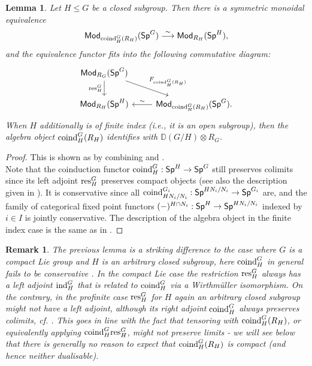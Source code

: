 \documentclass[reqno]{amsart}
\numberwithin{equation}{section}\theoremstyle{thms}
\newtheorem{lem}[equation]{Lemma}
\theoremstyle{defn}
\newtheorem{rem}[equation]{Remark}
\newcommand{\bD}{\mathbb{D}}
\newcommand{\tn}[1]{\textnormal{#1}}
\newcommand{\tsf}[1]{\textsf{\textup{#1}}}
\newcommand{\Mod}{\tsf{Mod}}
\newcommand{\spec}{\tsf{Sp}}
\newcommand{\specg}{\tsf{Sp}^G}
\begin{document}
\begin{lem}\label{lem:resasbasechangeprofinite}
Let $H \leq G$ be a closed subgroup. Then there is a symmetric monoidal equivalence 
$$\Mod_{\tn{coind}^{G}_H(R_{H})}(\specg) \stackrel{\sim}{\longrightarrow} \Mod_{R_{H}}(\spec^{H}),$$
and the equivalence functor fits into the following commutative diagram:
\[\begin{tikzcd}
	{\Mod_{R_G}(\specg)} & \\
	{\Mod_{R_{H}}(\spec^{H})} & {\Mod_{\tn{coind}^{G}_H(R_{H})}(\specg).}
	\arrow["{\tn{res}^G_H}"', from=1-1, to=2-1]
	\arrow["{F_{\tn{coind}^{G}_H(R_{H})}}", from=1-1, to=2-2]
	\arrow["\sim"', from=2-2, to=2-1]
\end{tikzcd}\]
When $H$ additionally is of finite index (i.e., it is an open subgroup), then the algebra object $\tn{coind}^{G}_H(R_{H})$ identifies with $\bD(G/H)\otimes R_G$.
\end{lem}
\begin{proof}
This is shown as \cite[Proposition 3.9]{bchnl25} by combining \cite[Lemma 3.9]{bs20} and \cite[Proposition 5.29]{mnn17}. \\
Note that the coinduction functor $\tn{coind}^G_H:\spec^{H} \to \specg$ still preserves colimits since its left adjoint $\tn{res}^G_H$ preserves compact objects (see also the description given in ). It is conservative since all $\tn{coind}^{G_i}_{HN_i/N_i}:\spec^{HN_i/N_i} \to \spec^{G_i}$ are, and the family of categorical fixed point functors $(-)^{H\cap N_i}: \spec^{H} \to \spec^{HN_i/N_i}$ indexed by $i \in I$ is jointly conservative. The description of the algebra object in the finite index case is the same as in .
\end{proof}

\begin{rem}
The previous lemma is a striking difference to the case where $G$ is a compact Lie group and $H$ is an arbitrary closed subgroup, here $\tn{coind}^G_H$ in general fails to be conservative \cite[Warning p.1034]{mnn17}. In the compact Lie case the restriction $\tn{res}^G_H$ always has a left adjoint $\tn{ind}^G_H$ that is related to $\tn{coind}^G_H$ via a Wirthmüller isomorphism. On the contrary, in the profinite case $\tn{res}^G_H$ for $H$ again an arbitrary closed subgroup might not have a left adjoint, although its right adjoint $\tn{coind}^G_H$ always preserves colimits, cf. . This goes in line with the fact that tensoring with $\tn{coind}^{G}_H(R_{H})$, or equivalently applying $\tn{coind}^G_H\tn{res}^G_H$, might not preserve limits - we will see below that there is generally no reason to expect that $\tn{coind}^{G}_H(R_{H})$ is compact (and hence neither dualisable).
\end{rem}
\end{document}
